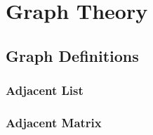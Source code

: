 \chapter{Graph Theory}

\section{Graph Definitions}

\subsection{Adjacent List}



\subsection{Adjacent Matrix}


